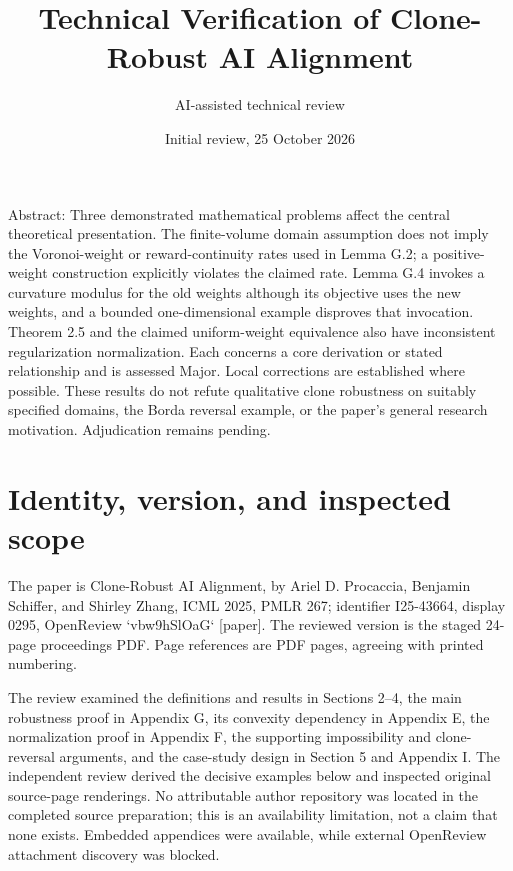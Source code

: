 \documentclass[10pt]{article}
\title{Technical Verification of
Clone-Robust AI Alignment}
\author{AI-assisted technical review}
\date{Initial review, 25 October 2026}
\begin{document}
\maketitle
Abstract: Three demonstrated mathematical problems affect the central theoretical presentation. The finite-volume domain assumption does not imply the Voronoi-weight or reward-continuity rates used in Lemma G.2; a positive-weight construction explicitly violates the claimed rate. Lemma G.4 invokes a curvature modulus for the old weights although its objective uses the new weights, and a bounded one-dimensional example disproves that invocation. Theorem 2.5 and the claimed uniform-weight equivalence also have inconsistent regularization normalization. Each concerns a core derivation or stated relationship and is assessed Major. Local corrections are established where possible. These results do not refute qualitative clone robustness on suitably specified domains, the Borda reversal example, or the paper’s general research motivation. Adjudication remains pending.\par
\section*{Identity, version, and inspected scope}
The paper is Clone-Robust AI Alignment, by Ariel D. Procaccia, Benjamin Schiffer, and Shirley Zhang, ICML 2025, PMLR 267; identifier I25-43664, display 0295, OpenReview `vbw9hSlOaG` [paper]. The reviewed version is the staged 24-page proceedings PDF. Page references are PDF pages, agreeing with printed numbering.\par
The review examined the definitions and results in Sections 2–4, the main robustness proof in Appendix G, its convexity dependency in Appendix E, the normalization proof in Appendix F, the supporting impossibility and clone-reversal arguments, and the case-study design in Section 5 and Appendix I. The independent review derived the decisive examples below and inspected original source-page renderings. No attributable author repository was located in the completed source preparation; this is an availability limitation, not a claim that none exists. Embedded appendices were available, while external OpenReview attachment discovery was blocked.\par
\end{document}
